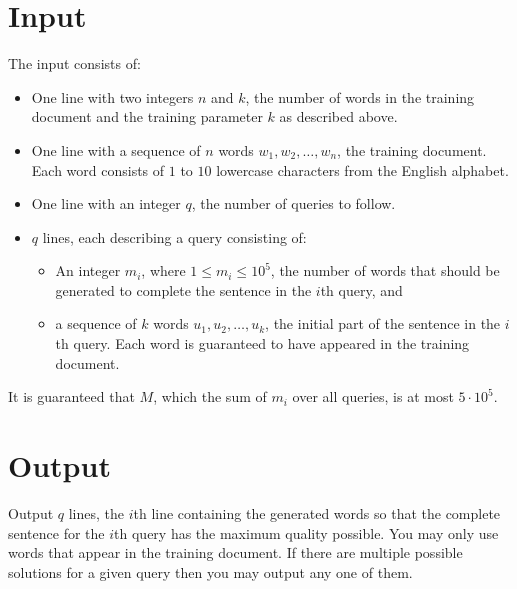 \section*{Input}
The input consists of:
\begin{itemize}
  \item One line with two integers $n$ and $k$, the number of words in the training document and the training
        parameter $k$ as described above.
  \item One line with a sequence of $n$ words $w_1, w_2, \ldots, w_n$, the training document.
        Each word consists of $1$ to $10$ lowercase characters from the English alphabet.
  \item One line with an integer $q$, the number of queries to follow.
  \item $q$ lines, each describing a query consisting of:
    \begin{itemize}
      \item An integer $m_i$, where $1 \leq m_i \leq 10^5$, the number of words that
            should be generated to complete the sentence in the $i$th query, and
      \item a sequence of $k$ words $u_1, u_2, \ldots, u_k$, the initial part of
            the sentence in the $i$th query.
            Each word is guaranteed to have appeared in the training document.
    \end{itemize}
\end{itemize}

It is guaranteed that $M$, which the sum of $m_i$ over all queries, is at most $5 \cdot 10^5$.

\section*{Output}
Output $q$ lines, the $i$th line containing the generated words so that the
complete sentence for the $i$th query has the maximum quality possible. You may
only use words that appear in the training document. If there are multiple
possible solutions for a given query then you may output any one of them.

